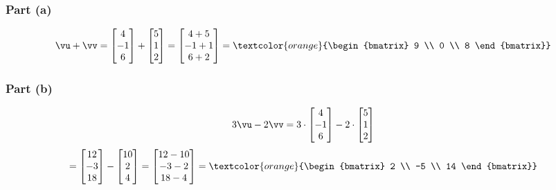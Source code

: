\begin{sol}
        \subsubsection*{Part (a)}
    \[
    \vu + \vv = \begin{bmatrix} 4 \\ -1 \\ 6 \end{bmatrix} + \begin{bmatrix} 5 \\ 1 \\ 2 \end{bmatrix} = \begin{bmatrix} 4+5 \\ -1+1 \\ 6+2 \end{bmatrix} = \textcolor{orange}{\begin{bmatrix} 9 \\ 0 \\ 8 \end{bmatrix}}
    \]
    
    \subsubsection*{Part (b)}
    \[
    3\vu - 2\vv = 3 \cdot \begin{bmatrix} 4 \\ -1 \\ 6 \end{bmatrix} - 2 \cdot \begin{bmatrix} 5 \\ 1 \\ 2 \end{bmatrix}
    \]
    \[
    = \begin{bmatrix} 12 \\ -3 \\ 18 \end{bmatrix} - \begin{bmatrix} 10 \\ 2 \\ 4 \end{bmatrix} = \begin{bmatrix} 12-10 \\ -3-2 \\ 18-4 \end{bmatrix} = \textcolor{orange}{\begin{bmatrix} 2 \\ -5 \\ 14 \end{bmatrix}}
    \]
    

\end{sol}
